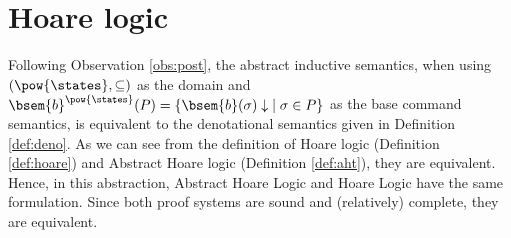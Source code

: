 \section{Hoare logic}
\label{chp:inst-hoare}


Following Observation \ref{obs:post}, the abstract inductive semantics, when 
using $(\pow{\states}, \subseteq)$ as the domain and 
$\bsem{b}^{\pow{\states}}(P) = \{ \bsem{b}(\sigma) \downarrow \; \mid \sigma 
\in P \}$ as the base command semantics, is equivalent to the denotational 
semantics given in Definition \ref{def:deno}. As we can see from the definition 
of Hoare logic (Definition \ref{def:hoare}) and Abstract Hoare logic (Definition 
\ref{def:aht}), they are equivalent. Hence, in this abstraction, Abstract Hoare 
Logic and Hoare Logic have the same formulation. Since both proof systems are 
sound and (relatively) complete, they are equivalent.
